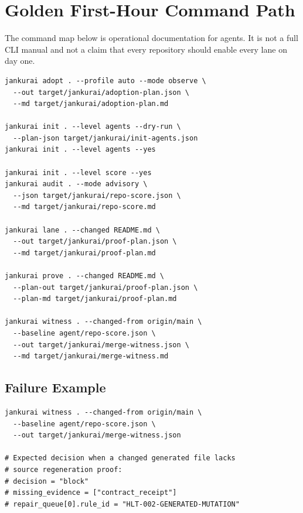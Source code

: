 \section{Golden First-Hour Command Path}

The command map below is operational documentation for agents. It is not a full CLI manual and not a claim that every repository should enable every lane on day one.

\begin{lstlisting}[style=codebox]
jankurai adopt . --profile auto --mode observe \
  --out target/jankurai/adoption-plan.json \
  --md target/jankurai/adoption-plan.md

jankurai init . --level agents --dry-run \
  --plan-json target/jankurai/init-agents.json
jankurai init . --level agents --yes

jankurai init . --level score --yes
jankurai audit . --mode advisory \
  --json target/jankurai/repo-score.json \
  --md target/jankurai/repo-score.md

jankurai lane . --changed README.md \
  --out target/jankurai/proof-plan.json \
  --md target/jankurai/proof-plan.md

jankurai prove . --changed README.md \
  --plan-out target/jankurai/proof-plan.json \
  --plan-md target/jankurai/proof-plan.md

jankurai witness . --changed-from origin/main \
  --baseline agent/repo-score.json \
  --out target/jankurai/merge-witness.json \
  --md target/jankurai/merge-witness.md
\end{lstlisting}

\subsection{Failure Example}

\begin{lstlisting}[style=codebox]
jankurai witness . --changed-from origin/main \
  --baseline agent/repo-score.json \
  --out target/jankurai/merge-witness.json

# Expected decision when a changed generated file lacks
# source regeneration proof:
# decision = "block"
# missing_evidence = ["contract_receipt"]
# repair_queue[0].rule_id = "HLT-002-GENERATED-MUTATION"
\end{lstlisting}
